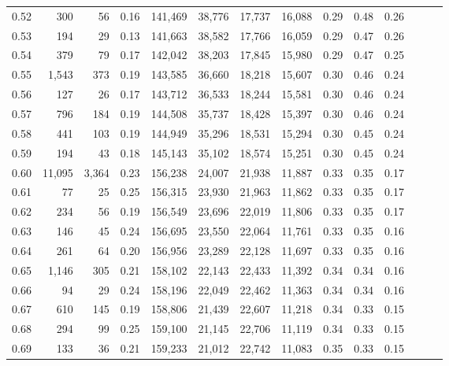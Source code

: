\begin{tabular}{rrrrrrrrrrrrrr}
0.52 &     300 &     56 &  0.16 &  141,469 &   38,776 &  17,737 &  16,088 &  0.29 &  0.48 &      0.26 \\
0.53 &     194 &     29 &  0.13 &  141,663 &   38,582 &  17,766 &  16,059 &  0.29 &  0.47 &      0.26 \\
0.54 &     379 &     79 &  0.17 &  142,042 &   38,203 &  17,845 &  15,980 &  0.29 &  0.47 &      0.25 \\
0.55 &   1,543 &    373 &  0.19 &  143,585 &   36,660 &  18,218 &  15,607 &  0.30 &  0.46 &      0.24 \\
0.56 &     127 &     26 &  0.17 &  143,712 &   36,533 &  18,244 &  15,581 &  0.30 &  0.46 &      0.24 \\
0.57 &     796 &    184 &  0.19 &  144,508 &   35,737 &  18,428 &  15,397 &  0.30 &  0.46 &      0.24 \\
0.58 &     441 &    103 &  0.19 &  144,949 &   35,296 &  18,531 &  15,294 &  0.30 &  0.45 &      0.24 \\
0.59 &     194 &     43 &  0.18 &  145,143 &   35,102 &  18,574 &  15,251 &  0.30 &  0.45 &      0.24 \\
0.60 &  11,095 &  3,364 &  0.23 &  156,238 &   24,007 &  21,938 &  11,887 &  0.33 &  0.35 &      0.17 \\
0.61 &      77 &     25 &  0.25 &  156,315 &   23,930 &  21,963 &  11,862 &  0.33 &  0.35 &      0.17 \\
0.62 &     234 &     56 &  0.19 &  156,549 &   23,696 &  22,019 &  11,806 &  0.33 &  0.35 &      0.17 \\
0.63 &     146 &     45 &  0.24 &  156,695 &   23,550 &  22,064 &  11,761 &  0.33 &  0.35 &      0.16 \\
0.64 &     261 &     64 &  0.20 &  156,956 &   23,289 &  22,128 &  11,697 &  0.33 &  0.35 &      0.16 \\
0.65 &   1,146 &    305 &  0.21 &  158,102 &   22,143 &  22,433 &  11,392 &  0.34 &  0.34 &      0.16 \\
0.66 &      94 &     29 &  0.24 &  158,196 &   22,049 &  22,462 &  11,363 &  0.34 &  0.34 &      0.16 \\
0.67 &     610 &    145 &  0.19 &  158,806 &   21,439 &  22,607 &  11,218 &  0.34 &  0.33 &      0.15 \\
0.68 &     294 &     99 &  0.25 &  159,100 &   21,145 &  22,706 &  11,119 &  0.34 &  0.33 &      0.15 \\
0.69 &     133 &     36 &  0.21 &  159,233 &   21,012 &  22,742 &  11,083 &  0.35 &  0.33 &      0.15 \\

\end{tabular}

